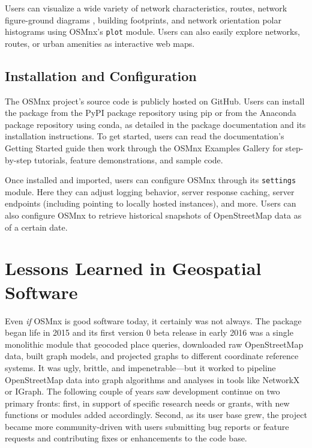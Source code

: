 \documentclass[12pt,letterpaper]{article} %
\begin{document}
Users can visualize a wide variety of network characteristics, routes, network figure-ground diagrams \citep{boeing_spatial_2021}, building footprints, and network orientation polar histograms \citep{boeing_urban_2019} using OSMnx's \texttt{plot} module. Users can also easily explore networks, routes, or urban amenities as interactive web maps.

\subsection{Installation and Configuration}

The OSMnx project's source code is publicly hosted on GitHub. Users can install the package from the PyPI package repository using pip or from the Anaconda package repository using conda, as detailed in the package documentation and its installation instructions. To get started, users can read the documentation's Getting Started guide then work through the OSMnx Examples Gallery for step-by-step tutorials, feature demonstrations, and sample code.

Once installed and imported, users can configure OSMnx through its \texttt{settings} module. Here they can adjust logging behavior, server response caching, server endpoints (including pointing to locally hosted instances), and more. Users can also configure OSMnx to retrieve historical snapshots of OpenStreetMap data as of a certain date.

\section{Lessons Learned in Geospatial Software}

Even \textit{if} OSMnx is good software today, it certainly was not always. The package began life in 2015 and its first version 0 beta release in early 2016 was a single monolithic module that geocoded place queries, downloaded raw OpenStreetMap data, built graph models, and projected graphs to different coordinate reference systems. It was ugly, brittle, and impenetrable---but it worked to pipeline OpenStreetMap data into graph algorithms and analyses in tools like NetworkX or IGraph. The following couple of years saw development continue on two primary fronts: first, in support of specific research needs or grants, with new functions or modules added accordingly. Second, as its user base grew, the project became more community-driven with users submitting bug reports or feature requests and contributing fixes or enhancements to the code base.
\end{document}
